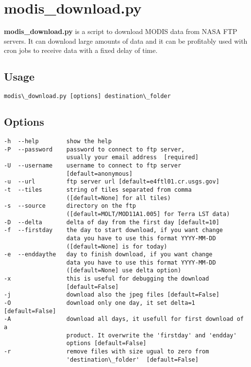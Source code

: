 \documentclass[a4paper,11pt,oneside]{sphinxmanual}
\begin{document}
\section{modis\_download.py}
\label{scripts/modis_download:modis-download-py}\label{scripts/modis_download::doc}
\textbf{modis\_download.py} is a script to download MODIS data from NASA FTP servers. It can download large amounts of data and it can be profitably used with cron jobs to receive data with a fixed delay of time.


\subsection{Usage}
\label{scripts/modis_download:usage}
\begin{Verbatim}[commandchars=\\\{\}]
modis\_download.py [options] destination\_folder
\end{Verbatim}


\subsection{Options}
\label{scripts/modis_download:options}
\begin{Verbatim}[commandchars=\\\{\}]
-h  --help        show the help
-P  --password    password to connect to ftp server,
                  usually your email address  [required]
-U  --username    username to connect to ftp server
                  [default=anonymous]
-u  --url         ftp server url [default=e4ftl01.cr.usgs.gov]
-t  --tiles       string of tiles separated from comma
                  ([default=None] for all tiles)
-s  --source      directory on the ftp
                  ([default=MOLT/MOD11A1.005] for Terra LST data)
-D  --delta       delta of day from the first day [default=10]
-f  --firstday    the day to start download, if you want change
                  data you have to use this format YYYY-MM-DD
                  ([default=None] is for today)
-e  --enddaythe   day to finish download, if you want change
                  data you have to use this format YYYY-MM-DD
                  ([default=None] use delta option)
-x                this is useful for debugging the download
                  [default=False]
-j                download also the jpeg files [default=False]
-O                download only one day, it set delta=1 [default=False]
-A                download all days, it usefull for first download of a
                  product. It overwrite the 'firstday' and 'endday'
                  options [default=False]
-r                remove files with size ugual to zero from
                  'destination\_folder'  [default=False]
\end{Verbatim}
\end{document}
